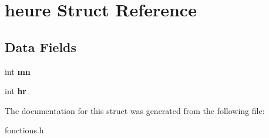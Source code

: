 \hypertarget{structheure}{}\section{heure Struct Reference}
\label{structheure}
\subsection*{Data Fields}
\begin{DoxyCompactItemize}
\item 
\mbox{\label{structheure_a5fd9e596b7016805641bde1f14e9969b}} 
int {\bfseries mn}
\item 
\mbox{\label{structheure_aef06c4330a73eadf7917280bfcc438db}} 
int {\bfseries hr}
\end{DoxyCompactItemize}


The documentation for this struct was generated from the following file\+:\begin{DoxyCompactItemize}
\item 
fonctions.\+h\end{DoxyCompactItemize}

